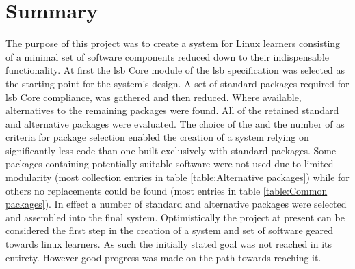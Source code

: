 \section{Summary}\label{Summary}

The purpose of this project was to create a system for Linux learners consisting of a minimal set of software components reduced down to their indispensable functionality. At first the \gls{lsb} Core module of the \gls{lsb} specification was selected as the starting point for the system's design. A set of standard packages required for \gls{lsb} Core compliance, was gathered and then reduced. Where available, alternatives to the remaining packages were found. All of the retained standard and alternative packages were evaluated. The choice of the  and the number of  as criteria for package selection enabled the creation of a system relying on significantly less code than one built exclusively with standard packages. Some packages containing potentially suitable software were not used due to limited modularity (most collection entries in table \ref{table:Alternative packages}) while for others no replacements could be found (most entries in table \ref{table:Common packages}). In effect a number of standard and alternative packages were selected and assembled into the final system. Optimistically the project at present can be considered the first step in the creation of a system and set of software geared towards linux learners. As such the initially stated goal was not reached in its entirety. However good progress was made on the path towards reaching it.
